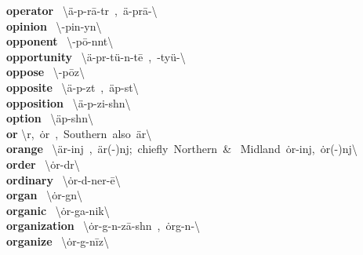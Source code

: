 \documentclass[10pt,a4paper]{article}
\begin{document}
\begin{multicols}{2}
\textbf{ operator }\quad \ \textbackslash \textprimstress \"{a}-p\textschwa -\textsecstress r\={a}-t\textschwa r\ ,\ \textprimstress \"{a}-\textsecstress pr\={a}-\textbackslash \\
\textbf{ opinion }\quad \ \textbackslash \textschwa -\textprimstress pin-y\textschwa n\textbackslash \\
\textbf{ opponent }\quad \ \textbackslash \textschwa -\textprimstress p\={o}-n\textschwa nt\textbackslash \\
\textbf{ opportunity }\quad \ \textbackslash \textsecstress \"{a}-p\textschwa r-\textprimstress t\"{u}-n\textschwa -t\={e}\ ,\ -\textprimstress ty\"{u}-\textbackslash \\
\textbf{ oppose }\quad \ \textbackslash \textschwa -\textprimstress p\={o}z\textbackslash \\
\textbf{ opposite }\quad \ \textbackslash \textprimstress \"{a}-p\textschwa -z\textschwa t\ ,\ \textprimstress \"{a}p-s\textschwa t\textbackslash \\
\textbf{ opposition }\quad \ \textbackslash \textsecstress \"{a}-p\textschwa -\textprimstress zi-sh\textschwa n\textbackslash \\
\textbf{ option }\quad \ \textbackslash \textprimstress \"{a}p-sh\textschwa n\textbackslash \\
\textbf{ or }\quad \textbackslash \textschwa r,\ \textprimstress \.{o}r\ ,\ Southern\ also\ \textprimstress \"{a}r\textbackslash \\
\textbf{ orange }\quad \ \textbackslash \textprimstress \"{a}r-inj\ ,\ \textprimstress \"{a}r(-\textschwa )nj;\ chiefly\ Northern\ \& \ Midland\ \.{o}r-inj,\ \textprimstress \.{o}r(-\textschwa )nj\textbackslash \\
\textbf{ order }\quad \ \textbackslash \textprimstress \.{o}r-d\textschwa r\textbackslash \\
\textbf{ ordinary }\quad \ \textbackslash \textprimstress \.{o}r-d\textschwa -\textsecstress ner-\={e}\textbackslash \\
\textbf{ organ }\quad \ \textbackslash \textprimstress \.{o}r-g\textschwa n\textbackslash \\
\textbf{ organic }\quad \ \textbackslash \.{o}r-\textprimstress ga-nik\textbackslash \\
\textbf{ organization }\quad \ \textbackslash \textsecstress \.{o}r-g\textschwa -n\textschwa -\textprimstress z\={a}-sh\textschwa n\ ,\ \textsecstress \.{o}rg-n\textschwa -\textbackslash \\
\textbf{ organize }\quad \ \textbackslash \textprimstress \.{o}r-g\textschwa -\textsecstress n\={i}z\textbackslash \\

\end{multicols}
\end{document}

